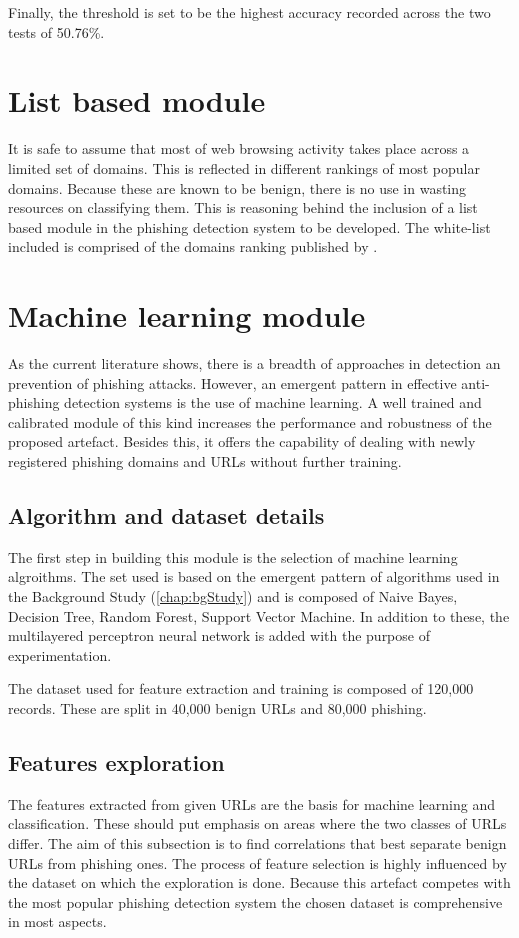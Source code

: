 Finally, the threshold is set to be the highest accuracy recorded across the two tests of 50.76\%.

\section{List based module}
It is safe to assume that most of web browsing activity takes place across a limited set of domains. This is reflected in different rankings of most popular domains. Because these are known to be benign, there is no use in wasting resources on classifying them. This is reasoning behind the inclusion of a list based module in the phishing detection system to be developed.
The white-list included is comprised of the domains ranking published by \cite{MAJESTIC_MILLION}.

\section{Machine learning module}
As the current literature shows, there is a breadth of approaches in detection an prevention of phishing attacks. However, an emergent pattern in effective anti-phishing detection systems is the use of machine learning. A well trained and calibrated module of this kind increases the performance and robustness of the proposed artefact. Besides this, it offers the capability of dealing with newly registered phishing domains and URLs without further training.

\subsection{Algorithm and dataset details}
The first step in building this module is the selection of machine learning algroithms. The set used is based on the emergent pattern of algorithms used in the Background Study (\ref{chap:bgStudy}) and is composed of Naive Bayes, Decision Tree, Random Forest, Support Vector Machine. In addition to these, the multilayered perceptron neural network is added with the purpose of experimentation.

The dataset used for feature extraction and training is composed of 120,000 records. These are split in 40,000 benign URLs and 80,000 phishing.

\subsection{Features exploration}
The features extracted from given URLs are the basis for machine learning and classification. These should put emphasis on areas where the two classes of URLs differ. The aim of this subsection is to find correlations that best separate benign URLs from phishing ones. The process of feature selection is highly influenced by the dataset on which the exploration is done. Because this artefact competes with the most popular phishing detection system the chosen dataset is comprehensive in most aspects.


